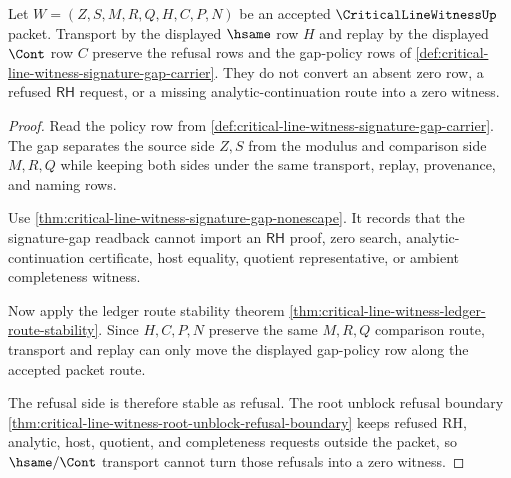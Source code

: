 \begin{theorem}
\label{thm:critical-line-witness-gap-policy-stability}
Let $W=(Z,S,M,R,Q,H,C,P,N)$ be an accepted $\CriticalLineWitnessUp$ packet. Transport by the displayed $\hsame$ row $H$ and replay by the displayed $\Cont$ row $C$ preserve the refusal rows and the gap-policy rows of \autoref{def:critical-line-witness-signature-gap-carrier}. They do not convert an absent zero row, a refused $\mathsf{RH}$ request, or a missing analytic-continuation route into a zero witness.
\end{theorem}
\begin{proof}
Read the policy row from \autoref{def:critical-line-witness-signature-gap-carrier}. The gap separates the source side $Z,S$ from the modulus and comparison side $M,R,Q$ while keeping both sides under the same transport, replay, provenance, and naming rows.

Use \autoref{thm:critical-line-witness-signature-gap-nonescape}. It records that the signature-gap readback cannot import an $\mathsf{RH}$ proof, zero search, analytic-continuation certificate, host equality, quotient representative, or ambient completeness witness.

Now apply the ledger route stability theorem \autoref{thm:critical-line-witness-ledger-route-stability}. Since $H,C,P,N$ preserve the same $M,R,Q$ comparison route, transport and replay can only move the displayed gap-policy row along the accepted packet route.

The refusal side is therefore stable as refusal. The root unblock refusal boundary \autoref{thm:critical-line-witness-root-unblock-refusal-boundary} keeps refused RH, analytic, host, quotient, and completeness requests outside the packet, so $\hsame/\Cont$ transport cannot turn those refusals into a zero witness.
\end{proof}

